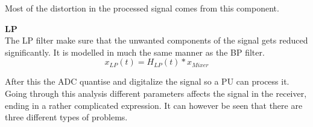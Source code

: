 Most of the distortion in the processed signal comes from this component.


\textbf{\Gls{LP}}\\
The LP filter make sure that the unwanted components of the signal gets reduced significantly. It is modelled in much the same manner as the BP filter. 
\begin{equation}
x_{LP}(t) = H_{LP}(t)*x_{Mixer}
\end{equation}
\begin{where}
\end{where}


After this the \gls{ADC} quantise and digitalize the signal so a \gls{PU} can process it. Going through this analysis different parameters affects the signal in the receiver, ending in a rather complicated expression. It can however be seen that there are three different types of problems. 



